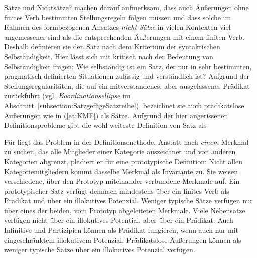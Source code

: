 \begin{Exkurs}{Sätze und Nichtsätze?}
\citet[320--321]{Hentschel_Weydt2021} machen darauf aufmerksam, dass auch Äußerungen ohne finites Verb bestimmten Stellungsregeln folgen müssen und dass solche im Rahmen des formbezogenen Ansatzes \textit{nicht-Sätze} in vielen Kontexten viel angemessener sind als die entsprechenden Äußerungen mit einem finiten Verb. Deshalb definieren sie den Satz nach dem Kriterium der syntaktischen Selbständigkeit. Hier lässt sich mit \citet[119]{Engel2009} kritisch nach der Bedeutung von Selbständigkeit fragen: Wie selbständig ist ein Satz, der nur in sehr bestimmten, pragmatisch definierten Situationen zulässig und verständlich ist? Aufgrund der Stellungsregularitäten, die \citet[44]{Musan2021_SGA} auf ein mitverstandenes, aber ausgelassenes Prädikat zurückführt (vgl. \textit{Koordinationsellipse} im Abschnitt~\ref{subsection:SatzgefügeSatzreihe}), bezeichnet sie auch prädikatslose Äußerungen wie in (\ref{ea:KME}) als Sätze. Aufgrund der hier angerissenen Definitionsprobleme gibt \citet[77]{Rothstein2023Syntax} die wohl weiteste Definition von Satz als   

Für \citet[70--71]{Welke2005Temp} liegt das Problem in der Definitionsmethode. Anstatt nach \textit{einem} Merkmal zu suchen, das alle Mitglieder einer Kategorie auszeichnet und von anderen Kategorien abgrenzt, plädiert er für eine prototypische Definition: Nicht allen Kategoriemitgliedern kommt dasselbe Merkmal als Invariante zu. Sie weisen verschiedene, über den Prototyp miteinander verbundene Merkmale auf. Ein prototypischer Satz verfügt demnach mindestens über ein finites Verb als Prädikat und über ein illokutives Potenzial. Weniger typische Sätze verfügen nur über eines der beiden, vom Prototyp abgeleiteten Merkmale. Viele Nebensätze verfügen nicht über ein illokutives Potential, aber über ein Prädikat. Auch Infinitive und Partizipien können als Prädikat fungieren, wenn auch nur mit eingeschränktem illokutivem Potenzial. Prädikatslose Äußerungen können als weniger typische Sätze über ein illokutives Potenzial verfügen.


\end{Exkurs}
